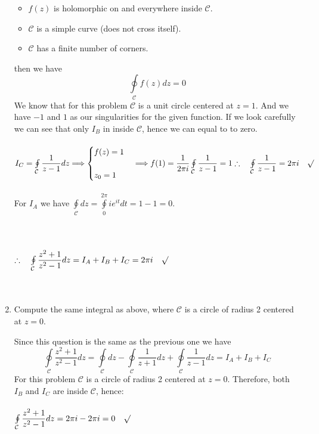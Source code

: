 \documentclass[fleqn]{article}
\begin{document}
\begin{enumerate}
{\begin{itemize}
            \item $f(z)$ is holomorphic on and everywhere inside $\mathcal{C}$.
            \item $\mathcal{C}$ is a simple curve (does not cross itself).
            \item $\mathcal{C}$ has a finite number of corners.
          \end{itemize}
          then we have 
          $$\oint\limits_{\mathcal{C}} f(z) dz=0$$
          We know that for this problem $\mathcal{C}$ is a unit circle centered at $z=1$. And we have $-1$ and $1$ as 
          our singularities for the given function. If we look carefully we can see that only $I_B$ in inside $\mathcal{C}$,
          hence we can equal to to zero. \\
          \\
          $
            I_C=\oint\limits_{\mathcal{C}} \dfrac{1}{z-1}dz \Longrightarrow \begin{cases}
              f(z)=1 \\
              \\
              z_0=1 
            \end{cases}
            \Longrightarrow f(1)=\dfrac{1}{2 \pi i} \oint\limits_{\mathcal{C}} \dfrac{1}{z-1}=1 \\
            \\
            \\
            \therefore ~~~ \oint\limits_{\mathcal{C}} \dfrac{1}{z-1}=2 \pi i ~~~ \surd
          $ 
          \\
          \\
          For $I_A$ we have $\oint\limits_{\mathcal C} dz=\oint\limits_{0}^{2 \pi} i e^{it} dt=1-1=0$. \\
          \\
          \\
          \\
          $
            \therefore ~~~ \oint\limits_{\mathcal C} \dfrac{z^2+1}{z^2-1} dz=I_A+I_B+I_C=2 \pi i ~~~ \surd
          $
          \\
          \\
          \\
        }

      \item Compute the same integral as above, where $\mathcal{C}$ is a circle of radius 2 centered at $z=0$.
      
        \textcolor{hwColor}{
          Since this question is the same as the previous one we have
          $$
            \oint\limits_{\mathcal{C}} \dfrac{z^2+1}{z^2-1} dz=\oint\limits_{\mathcal C} dz-\oint\limits_{\mathcal C} \dfrac{1}{z+1}dz+\oint\limits_{\mathcal C}\dfrac{1}{z-1}dz=I_A+I_B+I_C
          $$
          For this problem $\mathcal{C}$ is a circle of radius 2 centered at $z=0$. Therefore, both $I_B$ and $I_C$ 
          are inside $\mathcal{C}$, hence: \\
          \\
          $
            \oint\limits_{\mathcal C} \dfrac{z^2+1}{z^2-1} dz=2 \pi i-2\pi i=0 ~~~ \surd
          $ 
          \\
          \\
        }


\end{enumerate}
\end{document}
